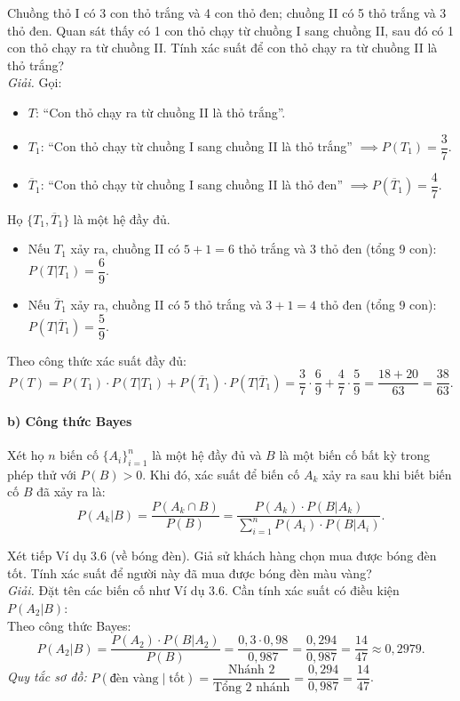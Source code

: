 \begin{vidu}
Chuồng thỏ I có 3 con thỏ trắng và 4 con thỏ đen; chuồng II có 5 thỏ trắng và 3 thỏ đen. Quan sát thấy có 1 con thỏ chạy từ chuồng I sang chuồng II, sau đó có 1 con thỏ chạy ra từ chuồng II. Tính xác suất để con thỏ chạy ra từ chuồng II là thỏ trắng?\\
\textit{Giải.} Gọi:
\begin{itemize}
    \item $T$: ``Con thỏ chạy ra từ chuồng II là thỏ trắng''.
    \item $T_1$: ``Con thỏ chạy từ chuồng I sang chuồng II là thỏ trắng'' $\implies P(T_1) = \dfrac{3}{7}$.
    \item $\overline{T}_1$: ``Con thỏ chạy từ chuồng I sang chuồng II là thỏ đen'' $\implies P(\overline{T}_1) = \dfrac{4}{7}$.
\end{itemize}
Họ $\{T_1, \overline{T}_1\}$ là một hệ đầy đủ.
\begin{itemize}
    \item Nếu $T_1$ xảy ra, chuồng II có $5 + 1 = 6$ thỏ trắng và 3 thỏ đen (tổng 9 con): $P(T|T_1) = \dfrac{6}{9}$.
    \item Nếu $\overline{T}_1$ xảy ra, chuồng II có 5 thỏ trắng và $3 + 1 = 4$ thỏ đen (tổng 9 con): $P(T|\overline{T}_1) = \dfrac{5}{9}$.
\end{itemize}
Theo công thức xác suất đầy đủ:
\[
P(T) = P(T_1) \cdot P(T|T_1) + P(\overline{T}_1) \cdot P(T|\overline{T}_1) = \frac{3}{7} \cdot \frac{6}{9} + \frac{4}{7} \cdot \frac{5}{9} = \frac{18 + 20}{63} = \frac{38}{63}.
\]
\end{vidu}

\paragraph{b) Công thức Bayes}
Xét họ $n$ biến cố $\{A_i\}_{i=1}^n$ là một hệ đầy đủ và $B$ là một biến cố bất kỳ trong phép thử với $P(B) > 0$. Khi đó, xác suất để biến cố $A_k$ xảy ra sau khi biết biến cố $B$ đã xảy ra là:
\[
P(A_k|B) = \frac{P(A_k \cap B)}{P(B)} = \frac{P(A_k) \cdot P(B|A_k)}{\displaystyle\sum_{i=1}^n P(A_i) \cdot P(B|A_i)}.
\]

\begin{vidu}
Xét tiếp Ví dụ 3.6 (về bóng đèn). Giả sử khách hàng chọn mua được bóng đèn tốt. Tính xác suất để người này đã mua được bóng đèn màu vàng?\\
\textit{Giải.} Đặt tên các biến cố như Ví dụ 3.6. Cần tính xác suất có điều kiện $P(A_2|B)$:\\
Theo công thức Bayes:
\[
P(A_2|B) = \frac{P(A_2) \cdot P(B|A_2)}{P(B)} = \frac{0{,}3 \cdot 0{,}98}{0{,}987} = \frac{0{,}294}{0{,}987} = \frac{14}{47} \approx 0{,}2979.
\]
\textit{Quy tắc sơ đồ:} $P(\text{đèn vàng} \mid \text{tốt}) = \dfrac{\text{Nhánh 2}}{\text{Tổng 2 nhánh}} = \dfrac{0{,}294}{0{,}987} = \dfrac{14}{47}$.
\end{vidu}

